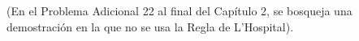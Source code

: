 \item (En el Problema Adicional 22 al final del Capítulo 2, se bosqueja una demostración en la que no se usa la Regla de L'Hospital).
